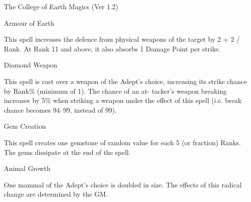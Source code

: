 \begin{Chapter}{The College of Earth Magics (Ver 1.2)}
\begin{spell}[S-4]{Armour of Earth }

\begin{effects}
 This  spell  increases  the  defence  from 
physical weapons of the target by 2 + 2 / Rank. At 
Rank 11 and above, it also absorbs 1 Damage Point 
per strike. 

\end{effects}
\end{spell}

\begin{spell}[S-5]{Diamond Weapon }

\begin{effects}
 This  spell  is  cast  over  a  weapon  of  the 
Adept’s  choice,  increasing  its  strike  chance  by 
Rank\%  (minimum  of  1).  The  chance  of  an  at-
tacker’s  weapon  breaking  increases  by  5\%  when 
striking a weapon under the effect of this spell (i.e. 
break chance becomes 94–99, instead of 99). 

\end{effects}
\end{spell}

\begin{spell}[S-6]{Gem Creation }

\begin{effects}
This spell creates one gemstone of random 
value  for  each  5  (or  fraction)  Ranks.  The  gems 
dissipate at the end of the spell. 

\end{effects}
\end{spell}

\begin{spell}[S-7]{Animal Growth }

\begin{effects}
 One  mammal  of  the  Adept’s  choice  is 
doubled  in  size.  The  effects  of  this  radical  change 
are determined by the GM. 


\end{effects}
\end{spell}
\end{Chapter}
